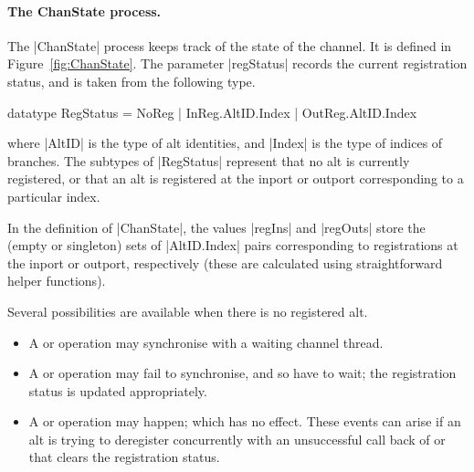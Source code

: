 
\paragraph{The {\cspmstyle ChanState} process.}

The |ChanState| process keeps track of the state of the channel.  It is
defined in Figure~\ref{fig:ChanState}.
The parameter |regStatus| records the current registration status, and is
taken from the following type.
%
\begin{cspm}
datatype RegStatus = NoReg | InReg.AltID.Index | OutReg.AltID.Index
\end{cspm}
%
where |AltID| is the type of alt identities, and |Index| is the type of
indices of branches.  The subtypes of |RegStatus| represent that no alt is
currently registered, or that an alt is registered at the inport or outport
corresponding to a particular index.  

In the definition of |ChanState|, the values |regIns| and |regOuts| store the
(empty or singleton) sets of |AltID.Index| pairs corresponding to
registrations at the inport or outport, respectively (these are calculated
using straightforward helper functions).

Several possibilities are available when there is no registered alt.
%
\begin{itemize}
\item A  or  operation may synchronise
  with a waiting channel thread.

\item A  or  operation may fail to
  synchronise, and so have to wait; the registration status is updated
  appropriately.

\item A  or  operation may happen;
  which has no effect.  These events can arise if an alt is trying to
  deregister concurrently with an unsuccessful call back of
   or  that clears the registration
  status. 
\end{itemize}

